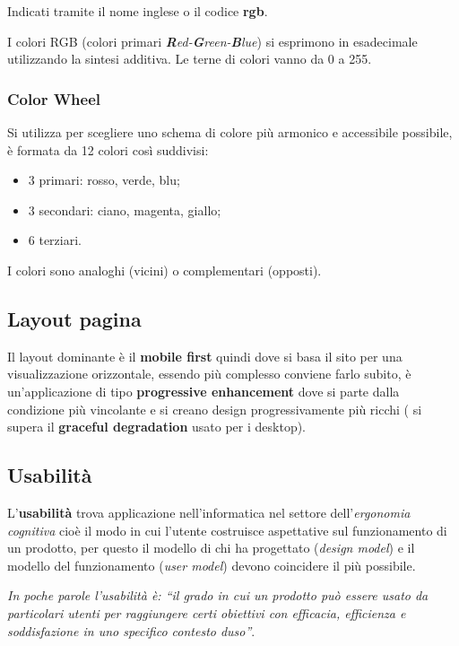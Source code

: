 Indicati tramite il nome inglese o il codice \textbf{rgb}.

I colori RGB (colori primari
\emph{\textbf{R}ed-\textbf{G}reen-\textbf{B}lue}) si esprimono in
esadecimale utilizzando la sintesi additiva. Le terne di colori vanno da
0 a 255.

\subsubsection{Color Wheel}\label{color-wheel}

Si utilizza per scegliere uno schema di colore più armonico e
accessibile possibile, è formata da 12 colori così suddivisi:

\begin{itemize}
\item
  3 primari: rosso, verde, blu;
\item
  3 secondari: ciano, magenta, giallo;
\item
  6 terziari.
\end{itemize}

I colori sono analoghi (vicini) o complementari (opposti).

\subsection{Layout pagina}\label{layout-pagina}

Il layout dominante è il \textbf{mobile first} quindi dove si basa il
sito per una visualizzazione orizzontale, essendo più complesso conviene
farlo subito, è un'applicazione di tipo \textbf{progressive enhancement}
dove si parte dalla condizione più vincolante e si creano design
progressivamente più ricchi ( si supera il \textbf{graceful degradation}
usato per i desktop).

\subsection{Usabilità}\label{usabilituxe0}

L'\textbf{usabilità} trova applicazione nell'informatica nel settore
dell'\emph{ergonomia cognitiva} cioè il modo in cui l'utente costruisce
aspettative sul funzionamento di un prodotto, per questo il modello di
chi ha progettato (\emph{design model}) e il modello del funzionamento
(\emph{user model}) devono coincidere il più possibile.

\emph{In poche parole l'usabilità è: ``il grado in cui un prodotto può
essere usato da particolari utenti per raggiungere certi obiettivi con
efficacia, efficienza e soddisfazione in uno specifico contesto
d\textquotesingle uso''}.

